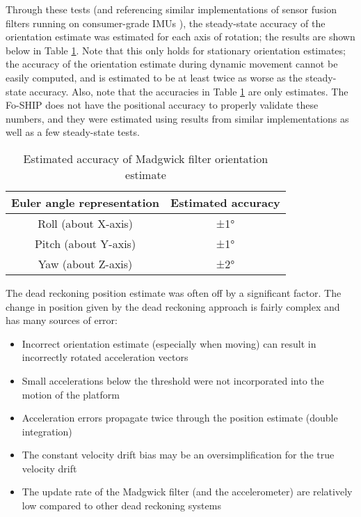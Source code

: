\documentclass[11pt]{ucthesisCP}
\begin{document}
Through these tests (and referencing similar implementations of sensor fusion filters running on consumer-grade IMUs \cite{madgwick} \cite{sfcomp} \cite{ekfmadmah} \cite{xiotech}), the steady-state accuracy of the orientation estimate was estimated for each axis of rotation; the results are shown below in Table \ref{tab:angleacc}. Note that this only holds for stationary orientation estimates; the accuracy of the orientation estimate during dynamic movement cannot be easily computed, and is estimated to be at least twice as worse as the steady-state accuracy. Also, note that the accuracies in Table \ref{tab:angleacc} are only estimates. The Fo-SHIP does not have the positional accuracy to properly validate these numbers, and they were estimated using results from similar implementations as well as a few steady-state tests.

\begin{table}[htbp]
\centering
\caption{Estimated accuracy of Madgwick filter orientation estimate}
\label{tab:angleacc}
\begin{tabular}{|c|c|}
	\hline
	Euler angle representation & Estimated accuracy \\
	\hline
	Roll (about X-axis) & ±1° \\
	\hline
	Pitch (about Y-axis) & ±1° \\
	\hline
	Yaw (about Z-axis) & ±2° \\
	\hline
\end{tabular}
\end{table}

The dead reckoning position estimate was often off by a significant factor. The change in position given by the dead reckoning approach is fairly complex and has many sources of error:
\begin{itemize}[noitemsep,topsep=0pt,]
\item Incorrect orientation estimate (especially when moving) can result in incorrectly rotated acceleration vectors
\item Small accelerations below the threshold were not incorporated into the motion of the platform
\item Acceleration errors propagate twice through the position estimate (double integration)
\item The constant velocity drift bias may be an oversimplification for the true velocity drift
\item The update rate of the Madgwick filter (and the accelerometer) are relatively low compared to other dead reckoning systems \cite{imuadvnav} \cite{ekfmadmah}
\end{itemize}
\end{document}
